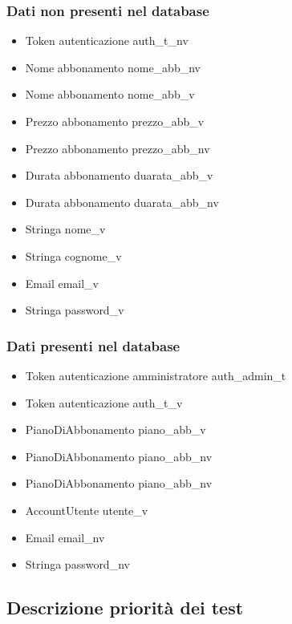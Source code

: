 \subsubsection{Dati non presenti nel database}
\begin{itemize}
    \item Token autenticazione auth\_t\_nv
    \item Nome abbonamento nome\_abb\_nv
    \item Nome abbonamento nome\_abb\_v
    \item Prezzo abbonamento prezzo\_abb\_v
    \item Prezzo abbonamento prezzo\_abb\_nv
    \item Durata abbonamento duarata\_abb\_v
    \item Durata abbonamento duarata\_abb\_nv
    \item Stringa nome\_v
    \item Stringa cognome\_v
    \item Email email\_v
    \item Stringa password\_v

\end{itemize}

\subsubsection{Dati presenti nel database}
\begin{itemize}
    \item Token autenticazione amministratore auth\_admin\_t
    \item Token autenticazione auth\_t\_v
    \item PianoDiAbbonamento piano\_abb\_v
    \item PianoDiAbbonamento piano\_abb\_nv
    \item PianoDiAbbonamento piano\_abb\_nv
    \item AccountUtente utente\_v
    \item Email email\_nv
    \item Stringa password\_nv

\end{itemize}

\subsection{Descrizione priorità dei test}

